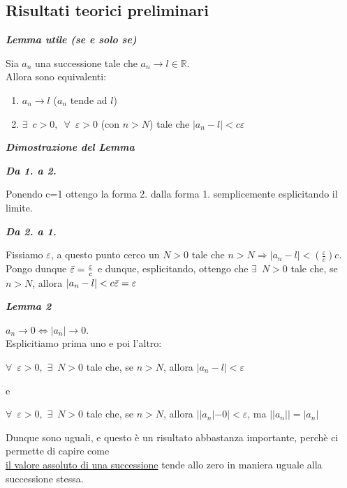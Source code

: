 \documentclass{article}
\theoremstyle{definition}
\begin{document}
\subsection{Risultati teorici preliminari}
\begin{center}
    \textbf{\textit{Lemma utile (se e solo se)}}
\end{center}
Sia $a_n$ una successione tale che $a_n \to l\in \mathbb{R}$.
\\
Allora sono equivalenti:
\begin{enumerate}
    \item $a_n \to l$ ($a_n$ tende ad $l$)
    \item $\exists \,\,\, c>0, \,\,\, \forall \,\,\, \varepsilon>0$ (con $n>N$) tale che $|a_n-l|<c\varepsilon$
\end{enumerate}
\begin{center}
    \textbf{\textit{Dimostrazione del Lemma}}
\end{center}
\begin{center}
    \textbf{\textit{Da 1. a 2.}}
\end{center}
Ponendo c=1 ottengo la forma 2. dalla forma 1. semplicemente esplicitando il limite.
\begin{center}
    \textbf{\textit{Da 2. a 1.}}
\end{center}
Fissiamo $\varepsilon$, a questo punto cerco un $N>0$ tale che $n>N \Rightarrow |a_n-l|<(\frac{\varepsilon}{c})c$.
\\
Pongo dunque $\Bar{\varepsilon}=\frac{\varepsilon}{c}$ e dunque, esplicitando, ottengo che $\exists \,\,\, N>0$ tale che, se $n>N$, allora $|a_n-l|<c\Bar{\varepsilon}=\varepsilon$

\newpage
\begin{center}
    \textbf{\textit{Lemma 2}}
\end{center}
$a_n \to 0 \Longleftrightarrow |a_n| \to 0$.
\\
Esplicitiamo prima uno e poi l'altro:
\begin{center}
    $\forall \,\,\, \varepsilon>0, \,\, \exists \,\,\, N>0$ tale che, se $n>N$, allora $|a_n-l|<\varepsilon$
\end{center}
e
\begin{center}
    $\forall \,\,\, \varepsilon>0, \,\, \exists \,\,\, N>0$ tale che, se $n>N$, allora $||a_n|-0|<\varepsilon$, ma $||a_n||=|a_n|$
\end{center}
Dunque sono uguali, e questo è un risultato abbastanza importante, perchè ci permette di capire come \\
\underline{il valore assoluto di una successione} tende allo zero in maniera uguale alla successione stessa.
\end{document}
